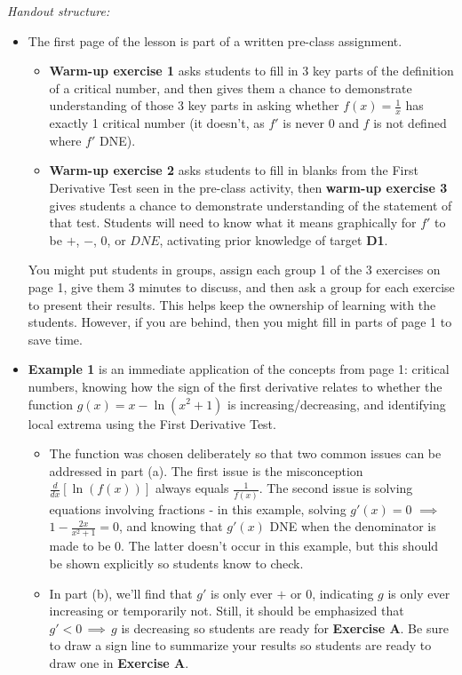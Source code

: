 \documentclass[10pt]{article}
\newcounter{example}[section]
\newcounter{exercise}[section]
\begin{document}
{\it Handout structure:}
\begin{itemize}
\item The first page of the lesson is part of a written pre-class assignment.
    \begin{itemize}
    \item {\bf\color{blue}Warm-up exercise 1} asks students to fill in 3 key parts of the definition of a critical number, and then gives them a chance to demonstrate understanding of those 3 key parts in asking whether $f(x)=\frac1x$ has exactly 1 critical number (it doesn't, as $f'$ is never 0 and $f$ is not defined where $f'$ DNE).
    \item {\bf\color{blue}Warm-up exercise 2} asks students to fill in blanks from the First Derivative Test seen in the pre-class activity, then {\bf\color{blue} warm-up exercise 3} gives students a chance to demonstrate understanding of the statement of that test. Students will need to know what it means graphically for $f'$ to be $+$, $-$, $0$, or $DNE$, activating prior knowledge of target {\bf\color{ForestGreen} D1}.
    \end{itemize}
You might put students in groups, assign each group 1 of the 3 exercises on page 1, give them 3 minutes to discuss, and then ask a group for each exercise to present their results. This helps keep the ownership of learning with the students. However, if you are behind, then you might fill in parts of page 1 to save time.
\item {\bf\color{blue}Example 1} is an immediate application of the concepts from page 1: critical numbers, knowing how the sign of the first derivative relates to whether the function $g(x)=x-\ln(x^2+1)$ is increasing/decreasing, and identifying local extrema using the First Derivative Test.
    \begin{itemize}
    \item The function was chosen deliberately so that two common issues can be addressed in part (a). The first issue is the misconception $\frac{d}{dx}[\ln(f(x))]$ always equals $\frac{1}{f(x)}$. The second issue is solving equations involving fractions - in this example, solving $g'(x)=0$ $\implies$ $1-\frac{2x}{x^2+1}=0$, and knowing that $g'(x)$ DNE when the denominator is made to be $0$. The latter doesn't occur in this example, but this should be shown explicitly so students know to check.
    \item In part (b), we'll find that $g'$ is only ever $+$ or $0$, indicating $g$ is only ever increasing or temporarily not. Still, it should be emphasized that $g'<0 \,\implies\, g$ is decreasing so students are ready for {\bf\color{blue}Exercise A}. Be sure to draw a sign line to summarize your results so students are ready to draw one in {\bf\color{blue} Exercise A}.

\end{itemize}
\end{itemize}
\end{document}
